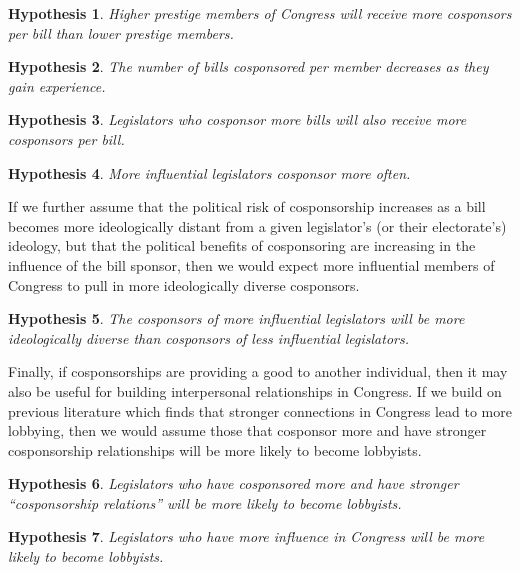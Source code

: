 \documentclass{article}
\newtheorem{hypothesis}{Hypothesis}
\begin{document}
\begin{hypothesis}
    \label{hyp:cosponsors_per_bill}
    Higher prestige members of Congress will receive more cosponsors per bill than lower prestige members.
\end{hypothesis}
\begin{hypothesis}
    \label{hyp:bills_cosponsored_experience}
    The number of bills cosponsored per member decreases as they gain experience. 
\end{hypothesis}
\begin{hypothesis}
    \label{hyp:reciprocal_cosponsorship}
    Legislators who cosponsor more bills will also receive more cosponsors per bill.
\end{hypothesis}
\begin{hypothesis}
    \label{hyp:leadership_cosponsors}
    More influential legislators cosponsor more often.
\end{hypothesis}

If we further assume that the political risk of cosponsorship increases as a bill becomes more ideologically distant from a given legislator's (or their electorate's) ideology, but that the political benefits of cosponsoring are increasing in the influence of the bill sponsor, then we would expect more influential members of Congress to pull in more ideologically diverse cosponsors.

\begin{hypothesis}
    \label{hyp:cosponsor_ideology}
    The cosponsors of more influential legislators will be more ideologically diverse than cosponsors of less influential legislators. 
\end{hypothesis}

Finally, if cosponsorships are providing a good to another individual, then it may also be useful for building interpersonal relationships in Congress. If we build on previous literature \cite{lazarus_mckay_herbel2016} \cite{vidal2012} which finds that stronger connections in Congress lead to more lobbying, then we would assume those that cosponsor more and have stronger cosponsorship relationships will be more likely to become lobbyists.

\begin{hypothesis}
    \label{hyp:lobbying_relations}
    Legislators who have cosponsored more and have stronger ``cosponsorship relations'' will be more likely to become lobbyists.
\end{hypothesis}
\begin{hypothesis}
    \label{hyp:lobbying_prestige}
    Legislators who have more influence in Congress will be more likely to become lobbyists. 
\end{hypothesis}
\end{document}
